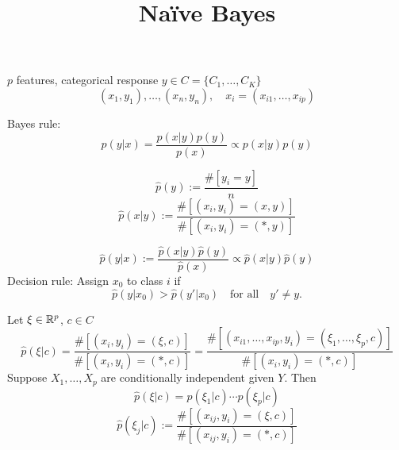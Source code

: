 \documentclass[12pt]{amsart}
\begin{document}
\title{Na\"ive Bayes}
\maketitle

$p$ features, categorical response $y\in C=\{C_1,\ldots,C_K\}$
\[
    (x_1, y_1),\ldots,(x_n, y_n),\quad x_i = (x_{i1},\ldots,x_{ip})
\]

Bayes rule:
\[
    p(y|x) = \frac{p(x|y)p(y)}{p(x)} \propto p(x|y)p(y)
\]


\[
    \hat{p}(y) := \frac{\#[y_i=y]}n
\]
\[
    \hat{p}(x|y) := \frac{\#[(x_i,y_i)=(x, y)]}{\#[(x_i,y_i)=(*,y)]}
\]

\[
    \hat{p}(y|x) := \frac{\hat{p}(x|y)\hat{p}(y)}{\hat{p}(x)} \propto \hat{p}(x|y)\hat{p}(y)
\]
Decision rule: Assign $x_0$ to class $i$ if
\[
    \hat{p}(y|x_0) > \hat{p}(y'|x_0)\quad\text{for all}\quad y'\neq y.
\]


Let $\xi\in \mathbb{R}^p$, $c\in C$
\[
    \hat{p}(\xi|c) = \frac{\#[(x_i,y_i)=(\xi, c)]}{\#[(x_i,y_i)=(*,c)]}
    = \frac{\#[(x_{i1},\ldots,x_{ip},y_i)
    =(\xi_1,\ldots,\xi_p, c)]}{\#[(x_i,y_i)=(*,c)]}
\]
Suppose $X_1,\ldots,X_p$ are conditionally independent given $Y$. Then
\[
    \hat{p}(\xi|c) = p(\xi_1|c)\cdots p(\xi_p|c)
\]
\[
    \hat{p}(\xi_j|c) := \frac{\#[(x_{ij},y_i)=(\xi, c)]}{\#[(x_{ij},y_i)=(*,c)]}
\]
\end{document}
